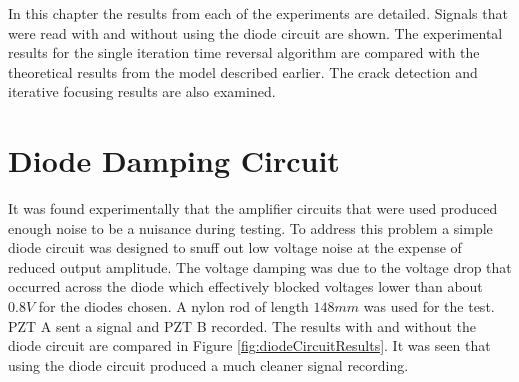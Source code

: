
In this chapter the results from each of the experiments are detailed. Signals that were read with and without using the diode circuit are shown. The experimental results for the single iteration time reversal algorithm are compared with the theoretical results from the model described earlier. The crack detection and iterative focusing results are also examined.

\section{Diode Damping Circuit}
It was found experimentally that the amplifier circuits that were used produced enough noise to be a nuisance during testing. To address this problem a simple diode circuit was designed to snuff out low voltage noise at the expense of reduced output amplitude. The voltage damping was due to the voltage drop that occurred across the diode which effectively blocked voltages lower than about $0.8V $ for the diodes chosen. A nylon rod of length $148 mm$ was used for the test. PZT A sent a signal and PZT B recorded. The results with and without the diode circuit are compared in Figure \ref{fig:diodeCircuitResults}. It was seen that using the diode circuit produced a much cleaner signal recording.

